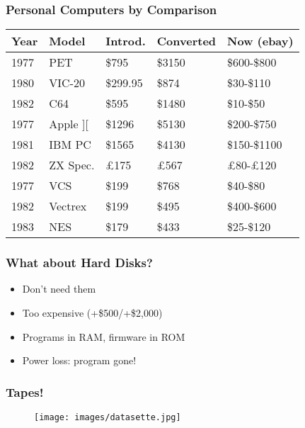 \documentclass[aspectratio=43]{uva-inf-presentation}
\begin{document}
\begin{frame}
\frametitle{Personal Computers by Comparison}

\begin{tabular}{|l|l|l|l|l|}
\hline Year & Model & Introd. & Converted & Now (ebay) \\ \hline
1977 & PET & \$795 & \$3150 & \$600-\$800 \\
1980 & VIC-20 & \$299.95 & \$874 & \$30-\$110 \\
1982 & C64 & \$595 & \$1480 & \$10-\$50 \\ \hline
1977 & Apple ][ & \$1296 & \$5130 & \$200-\$750 \\
1981 & IBM PC & \$1565 & \$4130 & \$150-\$1100 \\
1982 & ZX Spec. & \pounds 175 & \pounds 567 & \pounds 80-\pounds 120 \\ \hline
1977 & VCS & \$199 & \$768 & \$40-\$80 \\
1982 & Vectrex & \$199 & \$495 & \$400-\$600 \\
1983 & NES & \$179 & \$433 & \$25-\$120 \\ \hline
\end{tabular}

\end{frame}


\begin{frame}
\frametitle{What about Hard Disks?}

\begin{itemize}
\item Don't need them
\item Too expensive (+\$500/+\$2,000)
\item Programs in RAM, firmware in ROM
\item Power loss: program gone!
\end{itemize}

\end{frame}


\begin{frame}
\frametitle{Tapes!}

\begin{figure}
\texttt{[image: images/datasette.jpg]}
\end{figure}

\end{frame}

\end{document}
